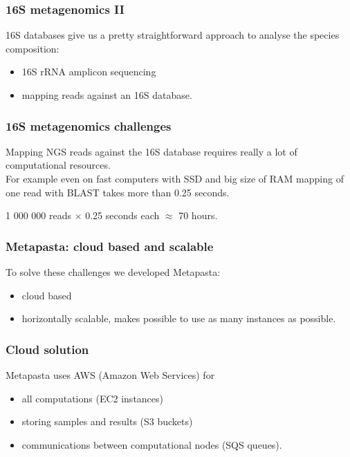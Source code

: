 \documentclass{beamer}
\begin{document}
\begin{frame}
\frametitle{16S metagenomics II}

16S databases give us a pretty straightforward approach to analyse the species composition:\\
\vspace{1em}

\begin{itemize}
  \item 16S rRNA amplicon sequencing
  \item mapping reads against an 16S database. 
\end{itemize}
\end{frame}



\begin{frame}
\frametitle{16S metagenomics challenges}
Mapping NGS reads against the 16S database requires really a lot of computational resources.\\
\vspace{1em}
For example even on fast computers with SSD and big size of RAM mapping of one read with BLAST takes more than 0.25 seconds.

\begin{center}
1 000 000 reads $\times$ 0.25 seconds each $\approx$ 70 hours.
\end{center}
\end{frame}

\begin{frame}
\frametitle{Metapasta: cloud based and scalable}

To solve these challenges we developed Metapasta:
\begin{itemize}
 \item cloud based
 \item horizontally scalable, makes possible to use as many instances as possible.
\end{itemize}

\end{frame}

\begin{frame}
\frametitle{Cloud solution}

Metapasta uses AWS (Amazon Web Services) for 
\begin{itemize}
  \item all computations (EC2 instances)
  \item storing samples and results (S3 buckets)
  \item communications between computational nodes (SQS queues).
\end{itemize}
\end{frame}
\end{document}
